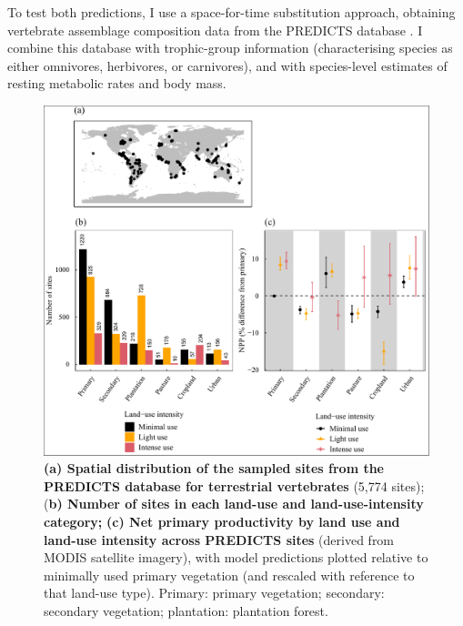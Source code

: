 To test both predictions, I use a space-for-time substitution approach, obtaining vertebrate assemblage composition data from the PREDICTS database \citep{Hudson2014, Hudson2017}. I combine this database with trophic-group information (characterising species as either omnivores, herbivores, or carnivores), and with species-level estimates of resting metabolic rates and body mass. 
  
\begin{figure}[h!]
\centering
\includegraphics[scale=0.75]{figures/Chapter5/Figure1_minorcorrections}
\caption[Map of PREDICTS sites, sample sizes and NPP by land use and land-use intensity]{\textbf{(a) Spatial distribution of the sampled sites from the PREDICTS database for terrestrial vertebrates} (5,774 sites); (\textbf{b) Number of sites in each land-use and land-use-intensity category;} \textbf{(c) Net primary productivity by land use and land-use intensity across PREDICTS sites} (derived from MODIS satellite imagery), with model predictions plotted relative to minimally used primary vegetation (and rescaled with reference to that land-use type). Primary: primary vegetation; secondary: secondary vegetation; plantation: plantation forest.}
\label{chap5_fig1}
\end{figure}

\clearpage

